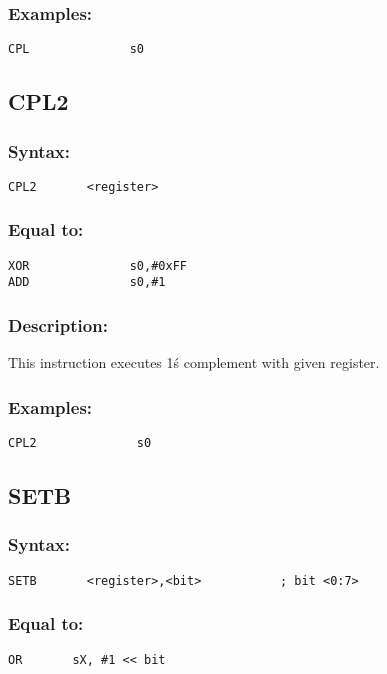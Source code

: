         \subsubsection{Examples:}
        {
            \usecodefont
            \verb'CPL              s0'\\
        }

    \subsection{CPL2}
        \subsubsection{Syntax:}
        {
            \usecodefont
            \verb'CPL2       <register>'
        }

        \subsubsection{Equal to:}
        {
            \usecodefont
            \verb'XOR              s0,#0xFF'\\
            \verb'ADD              s0,#1'\\
        }
        \subsubsection{Description:}
            This instruction executes 1\'s complement with given register.

        \subsubsection{Examples:}
        {
            \usecodefont
            \verb'CPL2              s0'\\
        }

    \subsection{SETB}
        \subsubsection{Syntax:}
        {
            \usecodefont
            \verb'SETB       <register>,<bit>           ; bit <0:7>'
        }

        \subsubsection{Equal to:}
         {
            \usecodefont
            \verb'OR       sX, #1 << bit'
        }


